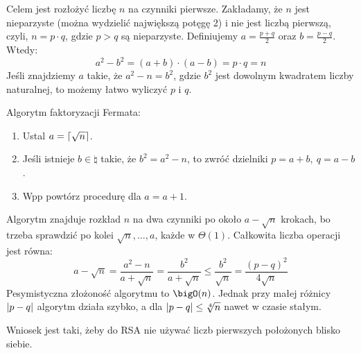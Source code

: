 Celem jest rozłożyć liczbę \( n \) na czynniki pierwsze. Zakładamy, że \( n \) jest nieparzyste (można wydzielić największą potęgę 2) i nie jest liczbą pierwszą, czyli, \( n = p \cdot q \), gdzie \( p > q \) są nieparzyste.
Definiujemy \( a = \frac{p+q}{2} \) oraz \( b = \frac{p-q}{2} \). Wtedy:
\[
	a^2 - b^2 = (a+b) \cdot (a-b) = p \cdot q = n
\]
Jeśli znajdziemy \( a \) takie, że \( a^2 - n = b^2 \), gdzie \( b^2 \) jest dowolnym kwadratem liczby naturalnej, to możemy łatwo wyliczyć \( p \) i \( q \).

\begin{greyframe}
	Algorytm faktoryzacji Fermata:
	\begin{enumerate}
		\item Ustal \( a = \left\lceil\sqrt{n}\right\rceil \).
		\item Jeśli istnieje \( b \in \natural \) takie, że \( b^2 = a^2 - n \), to zwróć dzielniki \( p = a+b, \ q = a-b \).
		\item Wpp powtórz procedurę dla \( a = a + 1\).
	\end{enumerate}
\end{greyframe}

Algorytm znajduje rozkład \( n \) na dwa czynniki po około \( a - \sqrt{n} \) krokach, bo trzeba sprawdzić po kolei \( \sqrt{n}, \dots, a \), każde w \( \Theta(1) \).
Całkowita liczba operacji jest równa:
\[
	a - \sqrt{n} = \frac{a^2 - n}{a + \sqrt{n}} = \frac{b^2}{a + \sqrt{n}} \leq \frac{b^2}{\sqrt{n}} = \frac{(p-q)^2}{4\sqrt{n}}
\]
Pesymistyczna złożoność algorytmu to \( \bigO(n) \). Jednak przy małej różnicy \( \left\lvert p - q\right\rvert \) algorytm działa szybko, a dla  \( \left\lvert p-q\right\rvert \leq \sqrt[4]{n} \) nawet w czasie stałym.

Wniosek jest taki, żeby do RSA nie używać liczb pierwszych położonych blisko siebie.